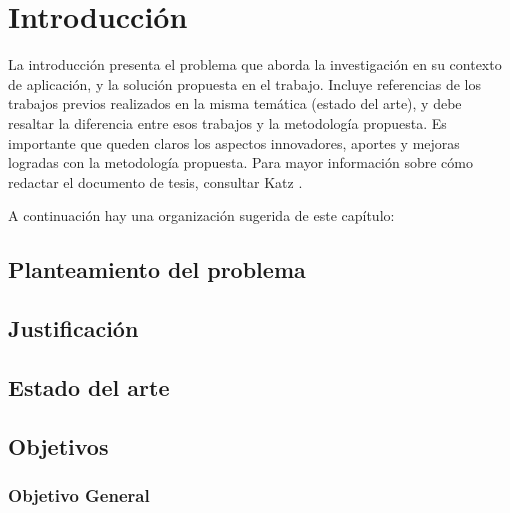 \documentclass[12pt]{report}
\begin{document}

{\setlength{\baselineskip}{2\baselineskip}
\setcounter{tocdepth}{3}
  \tableofcontents
\renewcommand\listfigurename{Lista de Figuras}
  \listoffigures
\renewcommand\listtablename{Lista de Tablas}
  \listoftables
\newpage
  \pagestyle{headings}








\pagestyle{empty}
\sloppy



  \par}
\chapter{Introducción} \label{sec:Introduccion}

La introducción presenta el problema que aborda la investigación en su contexto de aplicación, y la solución propuesta en el trabajo. Incluye referencias de los trabajos previos realizados en la misma temática (estado del arte), y debe resaltar la diferencia entre esos trabajos y la metodología propuesta. Es importante que queden claros los aspectos innovadores, aportes y mejoras logradas con la metodología propuesta. Para mayor información sobre cómo redactar el documento de tesis, consultar Katz \cite{katz2009research}.

A continuación hay una organización sugerida de este capítulo:

\section{Planteamiento del problema}

\section{Justificación}

\section{Estado del arte}

\section{Objetivos}

\subsection{Objetivo General}
\end{document}
